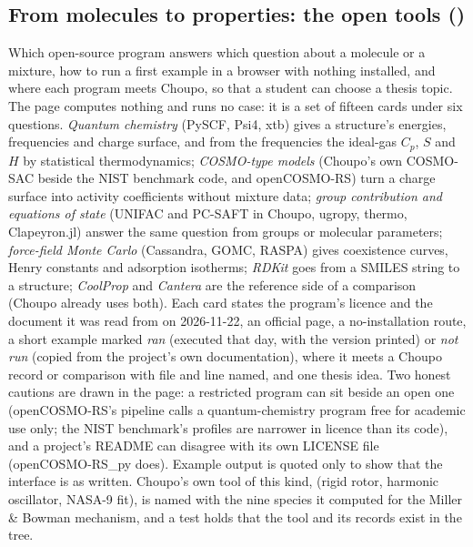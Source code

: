 \documentclass[11pt,a4paper]{article}
\begin{document}
\subsection*{From molecules to properties: the open tools \quad()}\label{sec:edu-open-molecular-tools}
Which open-source program answers which question about a molecule or a
mixture, how to run a first example in a browser with nothing installed,
and where each program meets Choupo, so that a student can choose a thesis
topic.  The page computes nothing and runs no case: it is a set of fifteen
cards under six questions.  \emph{Quantum chemistry} (PySCF, Psi4, xtb)
gives a structure's energies, frequencies and charge surface, and from the
frequencies the ideal-gas $C_p$, $S$ and $H$ by statistical thermodynamics;
\emph{COSMO-type models} (Choupo's own COSMO-SAC beside the NIST benchmark
code, and openCOSMO-RS) turn a charge surface into activity coefficients
without mixture data; \emph{group contribution and equations of state}
(UNIFAC and PC-SAFT in Choupo, ugropy, thermo, Clapeyron.jl) answer the same
question from groups or molecular parameters; \emph{force-field Monte Carlo}
(Cassandra, GOMC, RASPA) gives coexistence curves, Henry constants and
adsorption isotherms; \emph{RDKit} goes from a SMILES string to a structure;
\emph{CoolProp} and \emph{Cantera} are the reference side of a comparison
(Choupo already uses both).  Each card states the program's licence and the
document it was read from on 2026-11-22, an official page, a no-installation
route, a short example marked \emph{ran} (executed that day, with the version
printed) or \emph{not run} (copied from the project's own documentation),
where it meets a Choupo record or comparison with file and line named, and
one thesis idea.  Two honest cautions are drawn in the page: a restricted
program can sit beside an open one (openCOSMO-RS's pipeline calls a
quantum-chemistry program free for academic use only; the NIST benchmark's profiles are narrower in licence
than its code), and a project's README can disagree with its own LICENSE
file (openCOSMO-RS\_py does).  Example output is quoted only to show that
the interface is as written.  Choupo's own tool of this kind, 
(rigid rotor, harmonic oscillator, NASA-9 fit), is named with the nine
species it computed for the Miller \& Bowman mechanism, and a test holds
that the tool and its records exist in the tree.
\end{document}
